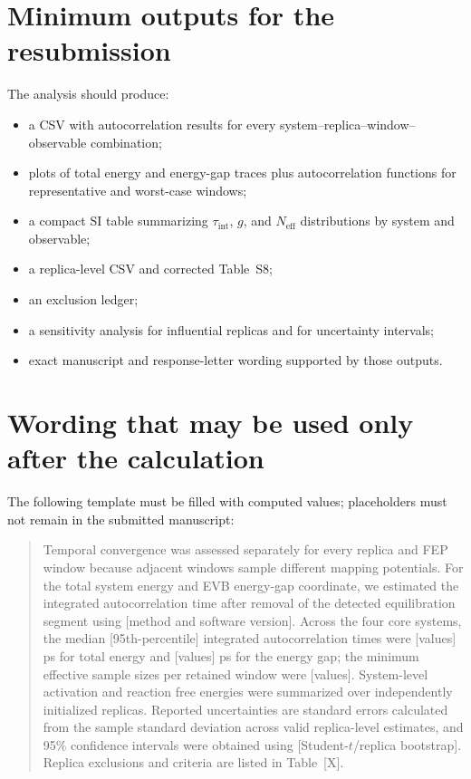 \documentclass[11pt,a4paper]{article}
\begin{document}
\section{Minimum outputs for the resubmission}

The analysis should produce:
\begin{itemize}
  \item a CSV with autocorrelation results for every system--replica--window--observable combination;
  \item plots of total energy and energy-gap traces plus autocorrelation functions for representative and worst-case windows;
  \item a compact SI table summarizing $\tau_{\mathrm{int}}$, $g$, and $N_{\mathrm{eff}}$ distributions by system and observable;
  \item a replica-level CSV and corrected Table~S8;
  \item an exclusion ledger;
  \item a sensitivity analysis for influential replicas and for uncertainty intervals;
  \item exact manuscript and response-letter wording supported by those outputs.
\end{itemize}

\section{Wording that may be used only after the calculation}

The following template must be filled with computed values; placeholders must not remain in the submitted manuscript:

\begin{quote}
Temporal convergence was assessed separately for every replica and FEP window because adjacent windows sample different mapping potentials. For the total system energy and EVB energy-gap coordinate, we estimated the integrated autocorrelation time after removal of the detected equilibration segment using [method and software version]. Across the four core systems, the median [95th-percentile] integrated autocorrelation times were [values] ps for total energy and [values] ps for the energy gap; the minimum effective sample sizes per retained window were [values]. System-level activation and reaction free energies were summarized over independently initialized replicas. Reported uncertainties are standard errors calculated from the sample standard deviation across valid replica-level estimates, and 95\% confidence intervals were obtained using [Student-$t$/replica bootstrap]. Replica exclusions and criteria are listed in Table~[X].
\end{quote}
\end{document}
